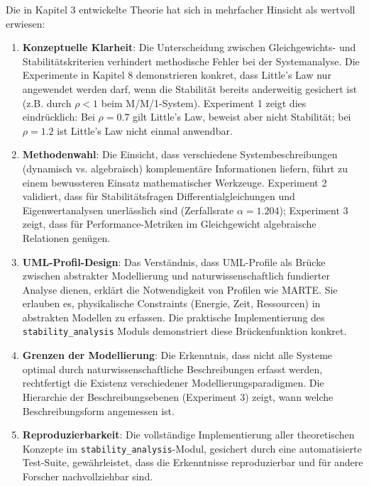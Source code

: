 ﻿\documentclass[a4paper,12pt]{scrreprt}
\theoremstyle{definition}
\begin{document}
Die in Kapitel 3 entwickelte Theorie hat sich in mehrfacher Hinsicht als wertvoll erwiesen:

\begin{enumerate}
	\item[-] \textbf{Konzeptuelle Klarheit}: Die Unterscheidung zwischen Gleichgewichts- und Stabilitätskriterien verhindert methodische Fehler bei der Systemanalyse. Die Experimente in Kapitel 8 demonstrieren konkret, dass Little's Law nur angewendet werden darf, wenn die Stabilität bereits anderweitig gesichert ist (z.B. durch $\rho < 1$ beim M/M/1-System). Experiment 1 zeigt dies eindrücklich: Bei $\rho = 0.7$ gilt Little's Law, beweist aber nicht Stabilität; bei $\rho = 1.2$ ist Little's Law nicht einmal anwendbar.
	
	\item[-] \textbf{Methodenwahl}: Die Einsicht, dass verschiedene Systembeschreibungen (dynamisch vs. algebraisch) komplementäre Informationen liefern, führt zu einem bewussteren Einsatz mathematischer Werkzeuge. Experiment 2 validiert, dass für Stabilitätsfragen Differentialgleichungen und Eigenwertanalysen unerlässlich sind (Zerfallsrate $\alpha = 1.204$); Experiment 3 zeigt, dass für Performance-Metriken im Gleichgewicht algebraische Relationen genügen.
	
	\item[-] \textbf{UML-Profil-Design}: Das Verständnis, dass UML-Profile als Brücke zwischen abstrakter Modellierung und naturwissenschaftlich fundierter Analyse dienen, erklärt die Notwendigkeit von Profilen wie MARTE. Sie erlauben es, physikalische Constraints (Energie, Zeit, Ressourcen) in abstrakten Modellen zu erfassen. Die praktische Implementierung des \texttt{stability\_analysis} Moduls demonstriert diese Brückenfunktion konkret.
	
	\item[-] \textbf{Grenzen der Modellierung}: Die Erkenntnis, dass nicht alle Systeme optimal durch naturwissenschaftliche Beschreibungen erfasst werden, rechtfertigt die Existenz verschiedener Modellierungsparadigmen. Die Hierarchie der Beschreibungsebenen (Experiment 3) zeigt, wann welche Beschreibungsform angemessen ist.
	
    \item[-] \textbf{Reproduzierbarkeit}: Die vollständige Implementierung
	aller theoretischen Konzepte im \texttt{stability\_analysis}-Modul,
	gesichert durch eine automatisierte Test-Suite, gewährleistet, dass
	die Erkenntnisse reproduzierbar und für andere Forscher nachvollziehbar
	sind.
\end{enumerate}
\end{document}
